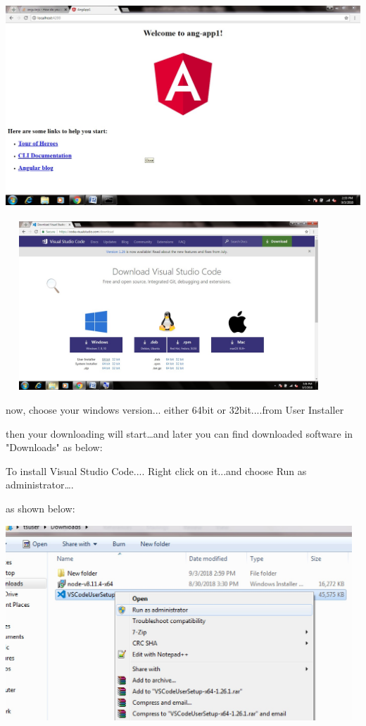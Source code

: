 \documentclass{article}
\begin{document}
\begin{center}
	\noindent \includegraphics*[width=5.41in, height=3.04in]{IMG-01-26}
\end{center}

\noindent 
\newpage
{}

\begin{center}
	\noindent \includegraphics*[width=4.83in, height=2.49in, trim=0.00in 0.23in 0.00in 0.00in]{IMG-01-27}\textbf{}
\end{center}

\noindent now, choose your windows version... either 64bit or 32bit....from User Installer\textbf{}

\noindent then your downloading will start{\dots}and later you can find downloaded software in "Downloads" as below:

\noindent To install Visual Studio Code.... Right click on it...and choose Run as administrator{\dots}.

\noindent as shown below:

\begin{center}
	\noindent \includegraphics*[width=5.12in, height=2.88in]{IMG-01-28}
\end{center}
\end{document}
